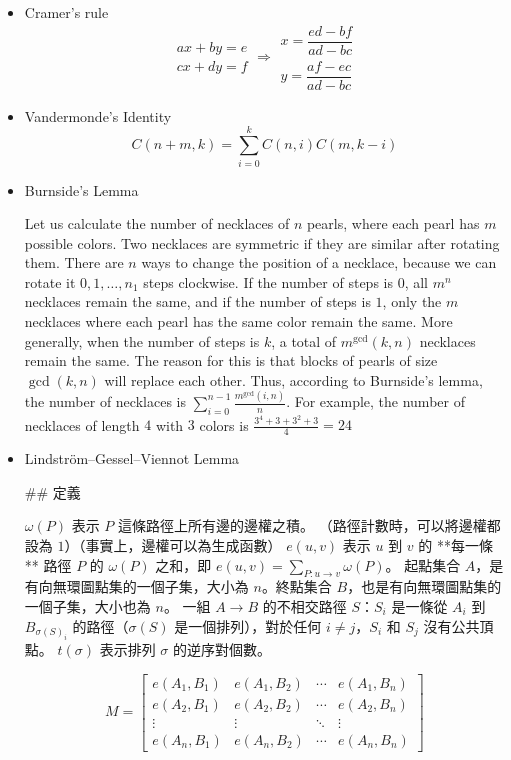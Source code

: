 \begin{itemize}
\item Cramer's rule
$$
\begin{aligned}ax+by=e\\cx+dy=f\end{aligned}
\Rightarrow
\begin{aligned}x=\dfrac{ed-bf}{ad-bc}\\y=\dfrac{af-ec}{ad-bc}\end{aligned}
$$

\item Vandermonde's Identity
$$
C(n + m, k) = \sum_{i=0}^k C(n, i)C(m, k - i)
$$

\item Burnside's Lemma

Let us calculate the number of necklaces of $n$ pearls, where each pearl has $m$ possible colors. Two necklaces are symmetric if they are similar after rotating them. There are $n$ ways to change the position of a necklace, because we can rotate it $0, 1, \dots, n_1$ steps clockwise. If the number of steps is 0, all $m^n$ necklaces remain the same, and if the number of steps is $1$, only the $m$ necklaces where each pearl has the same color remain the same. More generally, when the number of steps is $k$, a total of $m^\gcd(k,n)$ necklaces remain the same. The reason for this is that blocks of pearls of size $\gcd(k, n)$ will replace each other. Thus, according to Burnside’s lemma, the number of necklaces is $\sum_{i = 0}^{n - 1} \frac{m^\gcd(i, n)}{n}$. For example, the number of necklaces of length $4$ with $3$ colors is $\frac{3^4 + 3 + 3^2 + 3}{4} = 24$

\item Lindström–Gessel–Viennot Lemma

## 定義

$\omega(P)$ 表示 $P$ 這條路徑上所有邊的邊權之積。 （路徑計數時，可以將邊權都設為 $1$）（事實上，邊權可以為生成函數）
$e(u, v)$ 表示 $u$ 到 $v$ 的 **每一條** 路徑 $P$ 的 $\omega(P)$ 之和，即 $e(u, v)=\sum\limits_{P:u\rightarrow v}\omega(P)$。
起點集合 $A$，是有向無環圖點集的一個子集，大小為 $n$。終點集合 $B$，也是有向無環圖點集的一個子集，大小也為 $n$。
一組 $A\rightarrow B$ 的不相交路徑 $S$：$S_i$ 是一條從 $A_i$ 到 $B_{\sigma(S)_i}$ 的路徑（$\sigma(S)$ 是一個排列），對於任何 $i\ne j$，$S_i$ 和 $S_j$ 沒有公共頂點。
$t(\sigma)$ 表示排列 $\sigma$ 的逆序對個數。

$$
M = \begin{bmatrix}e(A_1,B_1)&e(A_1,B_2)&\cdots&e(A_1,B_n)\\
e(A_2,B_1)&e(A_2,B_2)&\cdots&e(A_2,B_n)\\
\vdots&\vdots&\ddots&\vdots\\
e(A_n,B_1)&e(A_n,B_2)&\cdots&e(A_n,B_n)\end{bmatrix}
$$


\end{itemize}
